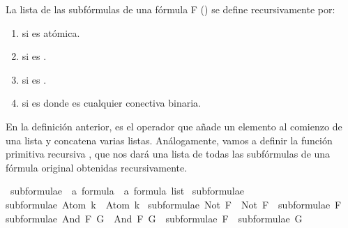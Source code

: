 \begin{isabellebody}
\begin{isamarkuptext}
  \begin{definicion}
La lista de las subfórmulas de una fórmula F () se define recursivamente por:
    \begin{enumerate}
      \item {} si  es atómica.
      \item {} si  es .
      \item {} si  es .
      \item {} si  es  donde \isa{{\isacharasterisk}} es cualquier conectiva binaria.
    \end{enumerate}
  \end{definicion}%
\end{isamarkuptext}\isamarkuptrue%
%
\begin{isamarkuptext}%
En la definición anterior, \isa{{\isacharhash}} es el operador que añade un elemento al comienzo de una lista
y \isa{{\isacharat}} concatena varias listas.
Análogamente, vamos a definir la función primitiva recursiva , que nos dará
una lista de todas las subfórmulas de una fórmula original obtenidas recursivamente.%
\end{isamarkuptext}\isamarkuptrue%
\isamarkupfalse%
\ subformulae\ {\isacharcolon}{\isacharcolon}\ {\isachardoublequoteopen}{\isacharprime}a\ formula\ {\isasymRightarrow}\ {\isacharprime}a\ formula\ list{\isachardoublequoteclose}\ \isanewline
{\isachardoublequoteopen}subformulae\ {\isasymbottom}\ {\isacharequal}\ {\isacharbrackleft}{\isasymbottom}{\isacharbrackright}{\isachardoublequoteclose}\ {\isacharbar}\isanewline
{\isachardoublequoteopen}subformulae\ {\isacharparenleft}Atom\ k{\isacharparenright}\ {\isacharequal}\ {\isacharbrackleft}Atom\ k{\isacharbrackright}{\isachardoublequoteclose}\ {\isacharbar}\isanewline
{\isachardoublequoteopen}subformulae\ {\isacharparenleft}Not\ F{\isacharparenright}\ {\isacharequal}\ Not\ F\ {\isacharhash}\ subformulae\ F{\isachardoublequoteclose}\ {\isacharbar}\isanewline
{\isachardoublequoteopen}subformulae\ {\isacharparenleft}And\ F\ G{\isacharparenright}\ {\isacharequal}\ And\ F\ G\ {\isacharhash}\ subformulae\ F\ {\isacharat}\ subformulae\ G{\isachardoublequoteclose}\ {\isacharbar}\isanewline

\end{isabellebody}
